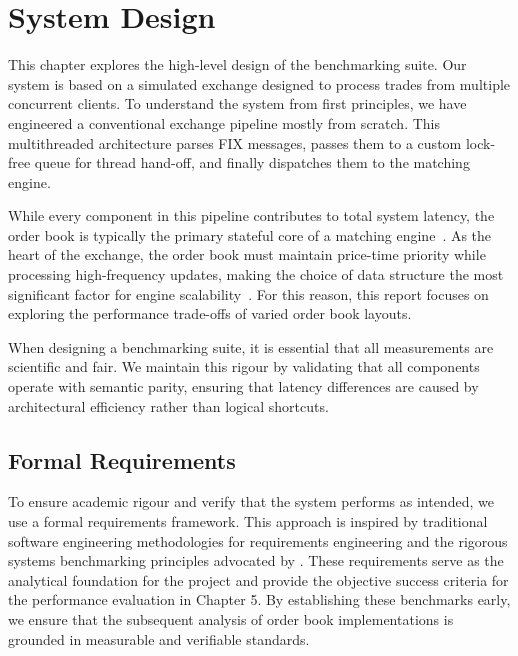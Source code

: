 \chapter{System Design}
\label{chap:system_design}

This chapter explores the high-level design of the benchmarking suite. 
Our system is based on a simulated exchange designed to process trades from 
multiple concurrent clients. 
To understand the system from first principles, we have engineered a 
conventional exchange pipeline mostly from scratch. 
This multithreaded architecture parses FIX messages, passes them to a custom 
lock-free queue for thread hand-off, and finally dispatches them to the 
matching engine. 

While every component in this pipeline contributes to total system latency, 
the order book is typically the primary stateful core of a 
matching engine~\citep{bilokon2023cpp}. As the heart of the exchange, 
the order book must maintain price-time priority while processing 
high-frequency updates, making the choice of data structure the most 
significant factor for engine scalability~\citep{harrisequity}. For this 
reason, this report focuses on exploring the performance trade-offs of 
varied order book layouts. 

When designing a benchmarking suite, it is essential that all measurements 
are scientific and fair. We maintain this rigour by validating that all 
components operate with semantic parity, ensuring that latency 
differences are caused by architectural efficiency rather than logical 
shortcuts.

\section{Formal Requirements}
\label{sec:system_formal_requirements}
To ensure academic rigour and verify that the system performs as intended, 
we use a formal requirements framework. This approach is inspired by 
traditional software engineering methodologies for requirements engineering 
\citep{sommerville2015} and the rigorous systems benchmarking principles 
advocated by \citet{gregg2013systems}. These requirements serve as 
the analytical foundation for the project and provide the objective 
success criteria for the performance evaluation in Chapter 5. By 
establishing these benchmarks early, we ensure that the subsequent 
analysis of order book implementations is grounded in measurable and 
verifiable standards.


